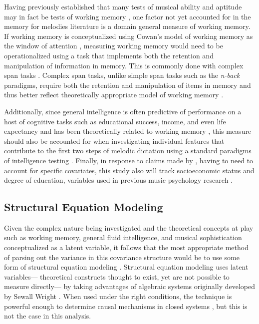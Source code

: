 \documentclass[12pt,]{book}
\begin{document}
Having previously established that many tests of musical ability and aptitude may in fact be tests of working memory \citep{berzWorkingMemoryMusic1995}, one factor not yet accounted for in the memory for melodies literature is a domain general measure of working memory.
If working memory is conceptualized using Cowan's model of working memory as the window of attention \citep{cowanMagicalMysteryFour2010}, measuring working memory would need to be operationalized using a task that implements both the retention and manipulation of information in memory.
This is commonly done with complex span tasks \citep{unsworthAutomatedVersionOperation2005}.
Complex span tasks, unlike simple span tasks such as the \emph{n-back} paradigms, require both the retention and manipulation of items in memory and thus better reflect theoretically appropriate model of working memory \citep{cowanWorkingMemoryCapacity2005}.

Additionally, since general intelligence is often predictive of performance on a host of cognitive tasks such as educational success, income, and even life expectancy \citep{ritchieIntelligenceAllThat2015} and has been theoretically related to working memory \citep{kovacsProcessOverlapTheory2016}, this measure should also be accounted for when investigating individual features that contribute to the first two steps of melodic dictation using a standard paradigms of intelligence testing \citep{ravenManualRavenProgressive1994, thurstonePrimaryMentalAbilities1938}.
Finally, in response to claims made by \citet{okadaIndividualDifferencesMusical2018}, having to need to account for specific covariates, this study also will track socioeconomic status and degree of education, variables used in previous music psychology research \citep{corrigallMusicTrainingCognition2013, swaminathanRevisitingAssociationMusic2017}.

\hypertarget{structural-equation-modeling}{%
\subsection{Structural Equation Modeling}\label{structural-equation-modeling}}

Given the complex nature being investigated and the theoretical concepts at play such as working memory, general fluid intelligence, and musical sophistication conceptualized as a latent variable, it follows that the most appropriate method of parsing out the variance in this covariance structure would be to use some form of structural equation modeling \citep{beaujeanLatentVariableModeling2014}.
Structural equation modeling uses latent variables--- theoretical constructs thought to exist, yet are not possible to measure directly--- by taking advantages of algebraic systems originally developed by Sewall Wright \citep{wrightMethodPathCoefficents1934}.
When used under the right conditions, the technique is powerful enough to determine causal mechanisms in closed systems \citep{pearlBookWhyNew2018}, but this is not the case in this analysis.
\end{document}

